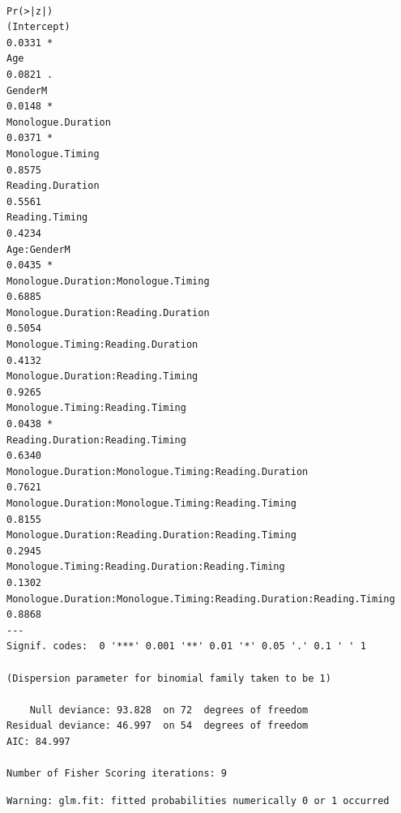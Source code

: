 \documentclass[
  english,
  doc,floatsintext]{apa6}
\begin{document}
\begin{verbatim}
                                                                    Pr(>|z|)  
(Intercept)                                                           0.0331 *
Age                                                                   0.0821 .
GenderM                                                               0.0148 *
Monologue.Duration                                                    0.0371 *
Monologue.Timing                                                      0.8575  
Reading.Duration                                                      0.5561  
Reading.Timing                                                        0.4234  
Age:GenderM                                                           0.0435 *
Monologue.Duration:Monologue.Timing                                   0.6885  
Monologue.Duration:Reading.Duration                                   0.5054  
Monologue.Timing:Reading.Duration                                     0.4132  
Monologue.Duration:Reading.Timing                                     0.9265  
Monologue.Timing:Reading.Timing                                       0.0438 *
Reading.Duration:Reading.Timing                                       0.6340  
Monologue.Duration:Monologue.Timing:Reading.Duration                  0.7621  
Monologue.Duration:Monologue.Timing:Reading.Timing                    0.8155  
Monologue.Duration:Reading.Duration:Reading.Timing                    0.2945  
Monologue.Timing:Reading.Duration:Reading.Timing                      0.1302  
Monologue.Duration:Monologue.Timing:Reading.Duration:Reading.Timing   0.8868  
---
Signif. codes:  0 '***' 0.001 '**' 0.01 '*' 0.05 '.' 0.1 ' ' 1

(Dispersion parameter for binomial family taken to be 1)

    Null deviance: 93.828  on 72  degrees of freedom
Residual deviance: 46.997  on 54  degrees of freedom
AIC: 84.997

Number of Fisher Scoring iterations: 9
\end{verbatim}

\begin{verbatim}
Warning: glm.fit: fitted probabilities numerically 0 or 1 occurred
\end{verbatim}
\end{document}
